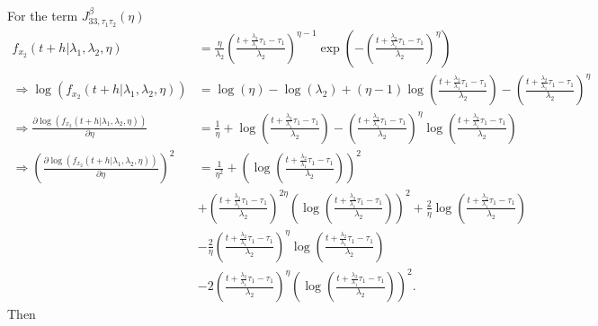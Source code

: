 \documentclass{article}
\begin{document}
For the term $J_{33,\tau_1\tau_2}^{\beta}(\eta)$
\begin{align}
f_{x_2}(t+h|\lambda_1,\lambda_2,\eta)&=\frac{\eta}{\lambda_2}\left(\frac{t+\frac{\lambda_2}{\lambda_1}\tau_1-\tau_1}{\lambda_2}\right)^{\eta-1}\exp\left(-\left(\frac{t+\frac{\lambda_2}{\lambda_1}\tau_1-\tau_1}{\lambda_2}\right)^{\eta}\right) \nonumber
\\
\Rightarrow \log\left(f_{x_2}(t+h|\lambda_1,\lambda_2,\eta)\right)&=\log(\eta)-\log(\lambda_2)+(\eta-1)\log\left(\frac{t+\frac{\lambda_2}{\lambda_1}\tau_1-\tau_1}{\lambda_2}\right)-\left(\frac{t+\frac{\lambda_2}{\lambda_1}\tau_1-\tau_1}{\lambda_2}\right)^{\eta} \nonumber
\\
\Rightarrow \frac{\partial \log\left(f_{x_2}(t+h|\lambda_1,\lambda_2,\eta)\right)}{\partial \eta}&=\frac{1}{\eta}+\log\left(\frac{t+\frac{\lambda_2}{\lambda_1}\tau_1-\tau_1}{\lambda_2}\right)-\left(\frac{t+\frac{\lambda_2}{\lambda_1}\tau_1-\tau_1}{\lambda_2}\right)^{\eta}\log\left(\frac{t+\frac{\lambda_2}{\lambda_1}\tau_1-\tau_1}{\lambda_2}\right) \nonumber
\\
\Rightarrow \left(\frac{\partial \log\left(f_{x_2}(t+h|\lambda_1,\lambda_2,\eta)\right)}{\partial \eta}\right)^2&=\frac{1}{\eta^2}+\left(\log\left(\frac{t+\frac{\lambda_2}{\lambda_1}\tau_1-\tau_1}{\lambda_2}\right)\right)^2 \nonumber
\\
&+\left(\frac{t+\frac{\lambda_2}{\lambda_1}\tau_1-\tau_1}{\lambda_2}\right)^{2\eta}\left(\log\left(\frac{t+\frac{\lambda_2}{\lambda_1}\tau_1-\tau_1}{\lambda_2}\right)\right)^2+\frac{2}{\eta}\log\left(\frac{t+\frac{\lambda_2}{\lambda_1}\tau_1-\tau_1}{\lambda_2}\right) \nonumber
\\
&-\frac{2}{\eta}\left(\frac{t+\frac{\lambda_2}{\lambda_1}\tau_1-\tau_1}{\lambda_2}\right)^{\eta}\log\left(\frac{t+\frac{\lambda_2}{\lambda_1}\tau_1-\tau_1}{\lambda_2}\right)\nonumber
\\
&-2\left(\frac{t+\frac{\lambda_2}{\lambda_1}\tau_1-\tau_1}{\lambda_2}\right)^{\eta}\left(\log\left(\frac{t+\frac{\lambda_2}{\lambda_1}\tau_1-\tau_1}{\lambda_2}\right)\right)^2.
 \label{eq:dev_f2_eta}
\end{align}
Then
\end{document}
